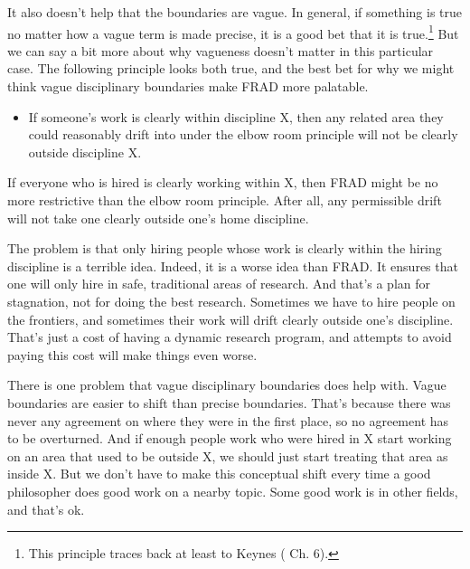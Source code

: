 \documentclass[
  11pt,
  letterpaper,
  DIV=11,
  numbers=noendperiod,
  twoside]{scrartcl}
\providecommand{\tightlist}{%
  \setlength{\itemsep}{0pt}\setlength{\parskip}{0pt}}
\begin{document}
It also doesn't help that the boundaries are vague. In general, if
something is true no matter how a vague term is made precise, it is a
good bet that it is true.\footnote{This principle traces back at least
  to Keynes ( Ch. 6).} But we can say a
bit more about why vagueness doesn't matter in this particular case. The
following principle looks both true, and the best bet for why we might
think vague disciplinary boundaries make FRAD more palatable.

\begin{itemize}
\tightlist
\item
  If someone's work is clearly within discipline X, then any related
  area they could reasonably drift into under the elbow room principle
  will not be clearly outside discipline X.
\end{itemize}

If everyone who is hired is clearly working within X, then FRAD might be
no more restrictive than the elbow room principle. After all, any
permissible drift will not take one clearly outside one's home
discipline.

The problem is that only hiring people whose work is clearly within the
hiring discipline is a terrible idea. Indeed, it is a worse idea than
FRAD. It ensures that one will only hire in safe, traditional areas of
research. And that's a plan for stagnation, not for doing the best
research. Sometimes we have to hire people on the frontiers, and
sometimes their work will drift clearly outside one's discipline. That's
just a cost of having a dynamic research program, and attempts to avoid
paying this cost will make things even worse.

There is one problem that vague disciplinary boundaries does help with.
Vague boundaries are easier to shift than precise boundaries. That's
because there was never any agreement on where they were in the first
place, so no agreement has to be overturned. And if enough people work
who were hired in X start working on an area that used to be outside X,
we should just start treating that area as inside X. But we don't have
to make this conceptual shift every time a good philosopher does good
work on a nearby topic. Some good work is in other fields, and that's
ok.
\end{document}
